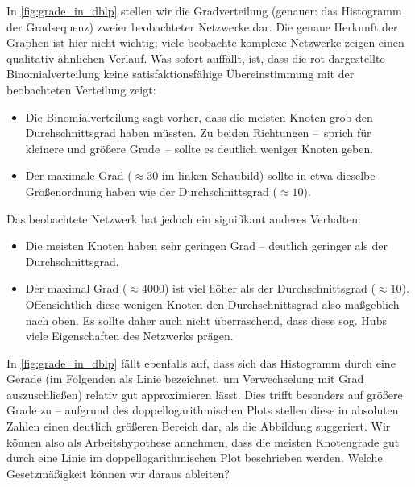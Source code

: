In \cref{fig:grade_in_dblp} stellen wir die Gradverteilung (genauer: das Histogramm der Gradsequenz) zweier beobachteter Netzwerke dar.
Die genaue Herkunft der Graphen ist hier nicht wichtig; viele beobachte komplexe Netzwerke zeigen einen qualitativ ähnlichen Verlauf.
Was sofort auffällt, ist, dass die rot dargestellte Binomialverteilung keine satisfaktionsfähige Übereinstimmung mit der beobachteten Verteilung zeigt:

\begin{itemize}
    \item Die  Binomialverteilung sagt vorher, dass die meisten Knoten grob den Durchschnittsgrad haben müssten.
          Zu beiden Richtungen --~sprich für kleinere und größere Grade~-- sollte es deutlich weniger Knoten geben.

    \item Der  maximale Grad ($\approx 30$ im linken Schaubild) sollte in etwa dieselbe Größenordnung haben wie der Durchschnittsgrad ($\approx 10$).
\end{itemize}

\noindent
Das beobachtete Netzwerk hat jedoch ein signifikant anderes Verhalten:
\begin{itemize}
    \item Die meisten Knoten haben sehr geringen Grad -- deutlich geringer als der Durchschnittsgrad.
    \item Der maximal Grad ($\approx 4000$) ist viel höher als der Durchschnittsgrad ($\approx 10$).
          Offensichtlich  diese wenigen Knoten den Durchschnittsgrad also maßgeblich nach oben.
          Es sollte daher auch nicht überraschend, dass diese sog. Hubs viele Eigenschaften des Netzwerks prägen.
\end{itemize}

In \cref{fig:grade_in_dblp}  fällt ebenfalls auf, dass sich das Histogramm durch eine Gerade (im Folgenden als Linie bezeichnet, um Verwechselung mit Grad auszuschließen) relativ gut approximieren lässt.
Dies trifft besonders auf größere Grade zu -- aufgrund des doppellogarithmischen Plots stellen diese in absoluten Zahlen einen deutlich größeren Bereich dar, als die Abbildung suggeriert.
Wir können also als Arbeitshypothese annehmen, dass die meisten Knotengrade gut durch eine Linie im doppellogarithmischen Plot beschrieben werden.
Welche Gesetzmäßigkeit können wir daraus ableiten?

